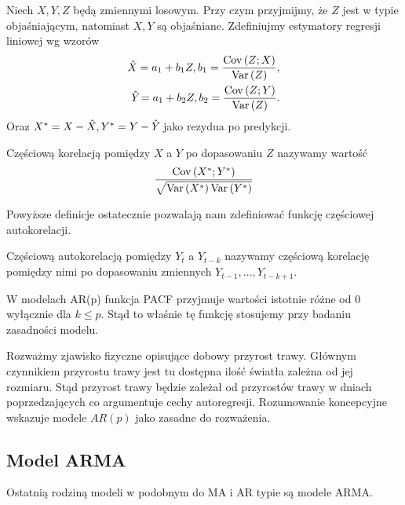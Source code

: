 \documentclass[10pt,a4paper]{book}
\begin{document}
Niech $X,Y,Z$ będą zmiennymi losowym. Przy czym przyjmijmy, że $Z$ jest w typie objaśniającym, natomiast $X,Y$ są objaśniane. Zdefiniujmy estymatory regresji liniowej wg wzorów
\begin{align*}
\predict{X}{} = a_1 + b_1 Z, b_1 = \frac{\Covariance{Z}{X}}{\Variance{Z}}, \\
\predict{Y}{} = a_1 + b_2 Z, b_2 = \frac{\Covariance{Z}{Y}}{\Variance{Z}}.
\end{align*} 
Oraz $X^\ast = X - \predict{X}{}, Y^\ast = Y - \predict{Y}{}$ jako rezydua po predykcji.

\begin{definition}
Częściową korelacją pomiędzy $X$ a $Y$ po dopasowaniu $Z$ nazywamy wartość
$$
\frac{\operatorname{Cov} \left( {X^\ast};{Y^\ast} \right)}{\sqrt{\operatorname{Var} \left( {X^\ast} \right)\operatorname{Var} \left( {Y^\ast} \right)}}
$$
\end{definition}

Powyższe definicje ostatecznie pozwalają nam zdefiniować funkcję częściowej autokorelacji.

\begin{definition}[PACF] 
Częściową autokorelacją pomiędzy $Y_t$ a $Y_{t-k}$ nazywamy częściową korelację pomiędzy nimi po dopasowaniu zmiennych $Y_{t-1}, \ldots, Y_{t-k+1}$.
\end{definition}

\begin{remark}
W modelach AR(p) funkcja PACF przyjmuje wartości istotnie różne od 0 wyłącznie dla $k \leq p$. Stąd to właśnie tę funkcję stosujemy przy badaniu zasadności modelu.
\end{remark}

\begin{example}
Rozważmy zjawisko fizyczne opisujące dobowy przyrost trawy. Głównym czynnikiem przyrostu trawy jest tu dostępna ilość światła zależna od jej rozmiaru. Stąd przyrost trawy będzie zależał od przyrostów trawy w dniach poprzedzających co argumentuje cechy autoregresji. Rozumowanie koncepcyjne wskazuje modele $AR(p)$ jako zasadne do rozważenia.
\end{example}

\subsection{Model ARMA}

Ostatnią rodziną modeli w podobnym do MA i AR typie są modele ARMA.
\end{document}
